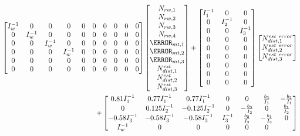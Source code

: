 \begin{align}
\begin{bmatrix}
I_w^{-1} & 0 & 0& 0 & 0 & 0 & 0 & 0 & 0 & 0 \\
0 & I_w^{-1} & 0& 0 & 0 & 0 & 0 & 0 & 0 & 0 \\ 
0 & 0 & I_w^{-1} & 0 & 0 & 0 & 0 & 0 & 0 & 0\\  
0 & 0 & 0 &  I_w^{-1} & 0& 0 & 0 & 0 & 0 & 0\\
0 & 0 & 0 & 0 & 0& 0 & 0 & 0 & 0 & 0\\
0 & 0 & 0 & 0 & 0& 0 & 0 & 0 & 0 & 0\\
\end{bmatrix}
\begin{bmatrix}
N_{rw,1} \\
N_{rw,2} \\
N_{rw,3}\\
N_{rw,4}\\
\m_{mt,1} \\
\m_{mt,2} \\
\m_{mt,3} \\
N^{est}_{dist,1} \\
N^{est}_{dist,2} \\
N^{est}_{dist,3}
\end{bmatrix}
+
\begin{bmatrix}
I_1^{-1} & 0 & 0 \\
0 & I_2^{-1} & 0 \\
0 & 0 & I_3^{-1}\\
0 & 0 & 0 \\
0 & 0 & 0 \\
0 & 0 & 0 \\
0 & 0 & 0 \\
0 & 0 & 0 \\
0 & 0 & 0 
\end{bmatrix}
\begin{bmatrix}
N^{est \ error}_{dist,1} \\
N^{est \ error}_{dist,2} \\
N^{est \ error}_{dist,3}\\
\end{bmatrix}
 \\
 + 
 \begin{bmatrix}
0.81I_1^{-1} & 0.77I_1^{-1} & 0.77I_1^{-1} & 0 & 0 & \frac{b_3}{I_1} & -\frac{b_2}{I_1}\\
0 & 0.125I_2^{-1} & -0.125I_2^{-1} & 0 & - \frac{b_3}{I_2} & 0 &  \frac{b_1}{I_2} \\ 
 -0.58I_3^{-1} & -0.58 I_3^{-1} & -0.58 I_3^{-1} & I_3^{-1} &  \frac{b_2}{I_3} &  -\frac{b_1}{I_3} & 0 \\  
 I_w^{-1} & 0 & 0 & 0 & 0 & 0 \\

\end{bmatrix}
\end{align}
